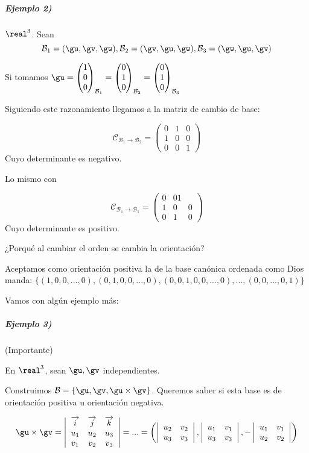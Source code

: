 \subparagraph{Ejemplo 2)} $\real^3$.
Sean
\[\mathcal{B}_1 = (\gu,\gv,\gw),\mathcal{B}_2 = (\gv,\gu,\gw),\mathcal{B}_3 = (\gw,\gu,\gv)\]

Si tomamos $\gu = \begin{pmatrix} 1\\0\\0\end{pmatrix}_{\mathcal{B}_1} = \begin{pmatrix}0\\1\\0\end{pmatrix}_{\mathcal{B}_2} = \begin{pmatrix}0\\1\\0\end{pmatrix}_{\mathcal{B}_3} $

Siguiendo este razonamiento llegamos a la matriz de cambio de base:

\[\mathcal{C}_{\mathcal{B}_1\to\mathcal{B}_2} = \begin{pmatrix} 0 & 1 & 0 \\ 1 & 0 & 0 \\ 0 & 0 & 1 \end{pmatrix}\]
Cuyo determinante es negativo.

Lo mismo con 

\[\mathcal{C}_{\mathcal{B}_1\to\mathcal{B}_1} = \begin{pmatrix} 0 & 0 1 \\ 1 & 0 & 0 \\ 0 & 1 & 0 \end{pmatrix}\]
Cuyo determinante es positivo.

¿Porqué al cambiar el orden se cambia la orientación?

\obs Aceptamos como orientación positiva la de la base canónica ordenada como Dios manda: $\{(1,0,0,...,0), (0,1,0,0,...,0), (0,0,1,0,0,...,0),...,(0,0,...,0,1)\}$

Vamos con algún ejemplo más:

\subparagraph{Ejemplo 3)} (Importante)

En $\real^3$, sean $\gu,\gv$ independientes.

Construimos $\mathcal{B} = \{\gu,\gv,\gu\times\gv\}$. Queremos saber si esta base es de orientación positiva u orientación negativa.

\[\gu\times\gv = \left|
\begin{array}{ccc}
 \overrightarrow{i} & \overrightarrow{j} & \overrightarrow{k}\\
u_1 & u_2 & u_3 \\
v_1 & v_2 & v_3
 \end{array}\right| = ... = \left(\left|\begin{array}{cc}u_2&v_2\\u_3&v_3\end{array}\right|,\left|\begin{array}{cc}u_1&v_1\\u_3&v_3\end{array}\right|,-\left|\begin{array}{cc}u_1&v_1\\u_2&v_2\end{array}\right|\right)\]

